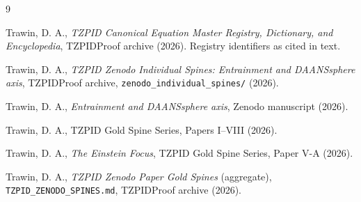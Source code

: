 \documentclass[11pt]{article}
\theoremstyle{remark}
\begin{document}
\begin{thebibliography}{9}

 Trawin, D. A., \emph{TZPID Canonical Equation Master Registry, Dictionary, and Encyclopedia}, TZPIDProof archive (2026). Registry identifiers as cited in text.

 Trawin, D. A., \emph{TZPID Zenodo Individual Spines: Entrainment and DAANSsphere axis}, TZPIDProof archive, \texttt{zenodo\_individual\_spines/} (2026).

 Trawin, D. A., \emph{Entrainment and DAANSsphere axis}, Zenodo manuscript (2026).

 Trawin, D. A., TZPID Gold Spine Series, Papers I--VIII (2026).

 Trawin, D. A., \emph{The Einstein Focus}, TZPID Gold Spine Series, Paper V-A (2026).

 Trawin, D. A., \emph{TZPID Zenodo Paper Gold Spines} (aggregate), \texttt{TZPID\_ZENODO\_SPINES.md}, TZPIDProof archive (2026).

\end{thebibliography}
\end{document}

